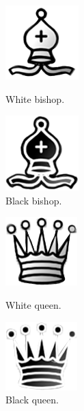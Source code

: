 \documentclass[12pt, a4paper]{article}
\begin{document}
\begin{figure}[h!]
\centering
\begin{minipage}{.5\textwidth}
  \centering
  \includegraphics[width=.4\linewidth]{figures/whitebishop.png}
  \caption{White bishop.}
\end{minipage}%
\begin{minipage}{.5\textwidth}
  \centering
  \includegraphics[width=.4\linewidth]{figures/blackbishop.png}
  \caption{Black bishop.}
\end{minipage}
\end{figure}

\begin{figure}[h!]
\centering
\begin{minipage}{.5\textwidth}
  \centering
  \includegraphics[width=.4\linewidth]{figures/whitequeen.png}
  \caption{White queen.}
\end{minipage}%
\begin{minipage}{.5\textwidth}
  \centering
  \includegraphics[width=.4\linewidth]{figures/blackqueen.png}
  \caption{Black queen.}
\end{minipage}
\end{figure}
\end{document}
